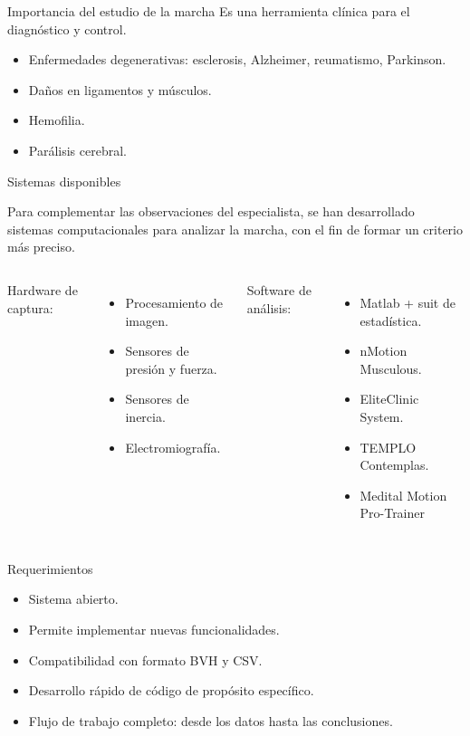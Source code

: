 \documentclass[aspectratio=169,spanish]{beamer} %
\begin{document}
\begin{frame}{Importancia del estudio de la marcha}
    Es una herramienta clínica para el diagnóstico y control.
    \begin{itemize}
        \item Enfermedades degenerativas: esclerosis, Alzheimer, reumatismo, Parkinson. 
        \item Daños en ligamentos y músculos.
        \item Hemofilia.
        \item Parálisis cerebral. 
    \end{itemize}
\end{frame}

\begin{frame}{Sistemas disponibles}
    \begin{block}{}
        Para complementar las observaciones del especialista, se han desarrollado sistemas computacionales para analizar la marcha, con el fin de formar un criterio más preciso. 
    \end{block}
    \begin{columns}
        Hardware de captura:
        \begin{itemize}
            \item Procesamiento de imagen.
            \item Sensores de presión y fuerza.
            \item Sensores de inercia.
            \item Electromiografía.
        \end{itemize}
        Software de análisis:
        \begin{itemize}
            \item Matlab + suit de estadística.
            \item nMotion Musculous.
            \item EliteClinic System.
            \item TEMPLO Contemplas.
            \item Medital Motion Pro-Trainer
        \end{itemize}
    \end{columns}
\end{frame}

\begin{frame}{Requerimientos}
    \begin{itemize}
        \item Sistema abierto.
        \item Permite implementar nuevas funcionalidades.
        \item Compatibilidad con formato BVH y CSV.
        \item Desarrollo rápido de código de propósito específico.
        \item Flujo de trabajo completo: desde los datos hasta las conclusiones. 
    \end{itemize}
\end{frame}
\end{document}
